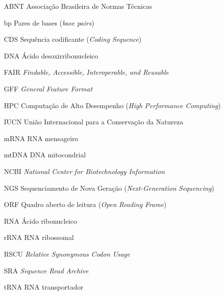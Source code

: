 \documentclass[
    12pt,               %
    openright,          %
    oneside,            %
    a4paper,            %
    chapter=TITLE,      %
    section=TITLE,      %
    english,            %
    brazil,             %
    final               %
]{abntex2}
\begin{document}
\begin{siglas}
    \item[ABNT] Associação Brasileira de Normas Técnicas
    \item[bp] Pares de bases (\textit{base pairs})
    \item[CDS] Sequência codificante (\textit{Coding Sequence})
    \item[DNA] Ácido desoxirribonucleico
    \item[FAIR] \textit{Findable, Accessible, Interoperable, and Reusable}
    \item[GFF] \textit{General Feature Format}
    \item[HPC] Computação de Alto Desempenho (\textit{High Performance Computing})
    \item[IUCN] União Internacional para a Conservação da Natureza
    \item[mRNA] RNA mensageiro
    \item[mtDNA] DNA mitocondrial
    \item[NCBI] \textit{National Center for Biotechnology Information}
    \item[NGS] Sequenciamento de Nova Geração (\textit{Next-Generation Sequencing})
    \item[ORF] Quadro aberto de leitura (\textit{Open Reading Frame})
    \item[RNA] Ácido ribonucleico
    \item[rRNA] RNA ribossomal
    \item[RSCU] \textit{Relative Synonymous Codon Usage}
    \item[SRA] \textit{Sequence Read Archive}
    \item[tRNA] RNA transportador
\end{siglas}

\tableofcontents*
\cleardoublepage

\textual

% 









\postextual


\end{document}
